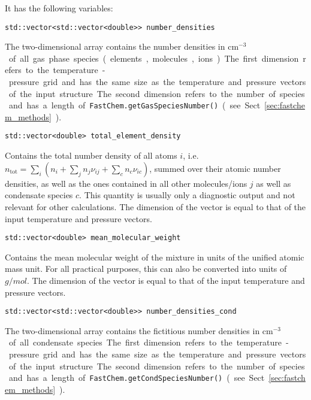 \documentclass[numbers=noenddot]{aux/fcmanual}
\begin{document}
It has the following variables:

\lstinline!std::vector<std::vector<double>> number_densities!
  \begin{addmargin}[25pt]{0pt}
    The two-dimensional array contains the number densities in \unit{cm$^{-3}$} of all gas phase species (elements, molecules, ions). The first dimension refers to the temperature-pressure grid and has the same size as the temperature and pressure vectors of the input structure. The second dimension refers to the number of species and has a length of \lstinline!FastChem.getGasSpeciesNumber()! (see Sect. \ref{sec:fastchem_methods}).
  \end{addmargin}
  
\bigbreak

\lstinline!std::vector<double> total_element_density!
\begin{addmargin}[25pt]{0pt}
  Contains the total number density of all atoms $i$, i.e. $n_\mathrm{tot} = \sum_i \left( n_i + \sum_j n_j \nu_{ij} + \sum_c n_c \nu_{ic} \right)$, summed over their atomic number densities, as well as the ones contained in all other molecules/ions $j$ as well as condensate species $c$. This quantity is usually only a diagnostic output and not relevant for other calculations. The dimension of the vector is equal to that of the input temperature and pressure vectors.
\end{addmargin}

\bigbreak

\lstinline!std::vector<double> mean_molecular_weight!
\begin{addmargin}[25pt]{0pt}
  Contains the mean molecular weight of the mixture in units of the unified atomic mass unit. For all practical purposes, this can also be converted into units of $\unit{g/mol}$. The dimension of the vector is equal to that of the input temperature and pressure vectors.
\end{addmargin}

\bigbreak

\lstinline!std::vector<std::vector<double>> number_densities_cond!
\begin{addmargin}[25pt]{0pt}
	The two-dimensional array contains the fictitious number densities in \unit{cm$^{-3}$} of all condensate species. The first dimension refers to the temperature-pressure grid and has the same size as the temperature and pressure vectors of the input structure. The second dimension refers to the number of species and has a length of \lstinline!FastChem.getCondSpeciesNumber()! (see Sect. \ref{sec:fastchem_methods}).
\end{addmargin}
\end{document}
